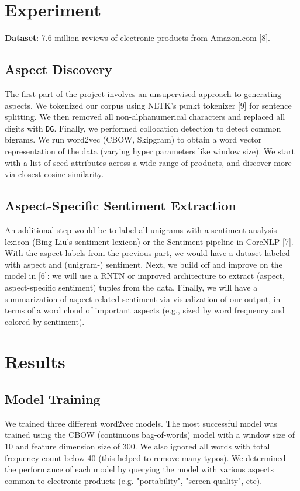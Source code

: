 \documentclass{article} %
\begin{document}
\section{Experiment} 

\textbf{Dataset}: 7.6 million reviews of electronic products from Amazon.com [8].



\subsection{Aspect Discovery}

The first part of the project involves an unsupervised approach to generating aspects. We tokenized our corpus using NLTK's punkt tokenizer [9] for sentence splitting. We then removed all non-alphanumerical characters and replaced all digits with \texttt{DG}. Finally, we performed collocation detection to detect common bigrams. We run word2vec (CBOW, Skipgram) to obtain a word vector representation of the data (varying hyper parameters like window size). We start with a list of seed attributes across a wide range of products, and discover more via closest cosine similarity.

\subsection{Aspect-Specific Sentiment Extraction}

An additional step would be to label all unigrams with a sentiment analysis lexicon (Bing Liu's sentiment lexicon) or the Sentiment pipeline in CoreNLP [7]. With the aspect-labels from the previous part, we would have a dataset labeled with aspect and (unigram-) sentiment. Next, we build off and improve on the model in [6]: we will use a RNTN or improved architecture to extract (aspect, aspect-specific sentiment) tuples from the data. Finally, we will have a summarization of aspect-related sentiment via visualization of our output, in terms of a word cloud of important aspects (e.g., sized by word frequency and colored by sentiment). 






\section{Results}

\subsection{Model Training} We trained three different word2vec models. The most successful model was trained using the CBOW (continuous bag-of-words) model with a window size of 10 and feature dimension size of 300. We also ignored all words with total frequency count below 40 (this helped to remove many typos). We determined the performance of each model by querying the model with various aspects common to electronic products (e.g. "portability", "screen quality", etc).
\end{document}
